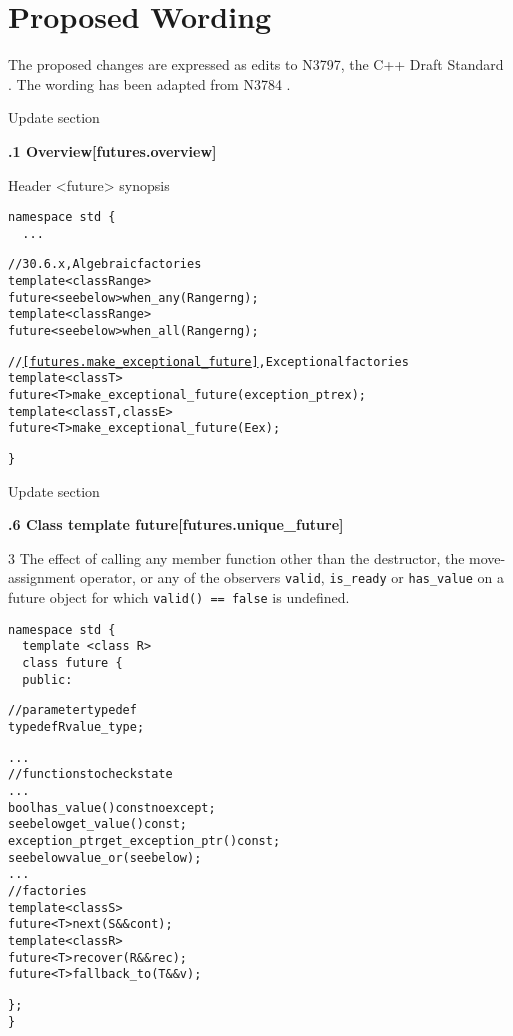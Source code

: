 \documentclass[a4paper,10pt]{article}
\newcommand{\wordingUpdateSubSubSec}[2]{\vspace{15pt}
\noindent
{\textbf{\quad #1\hfill\textbf{[#2]}}}
\label{#2}
\vspace{7pt}
}
\newcommand{\cpp}[1]{\lstinline{#1}}
\newcommand{\add}[1]{\textcolor{dkgreen}{#1}}
\begin{document}
\section{Proposed Wording}

The proposed changes are expressed as edits to N3797, the C++ Draft Standard \cite{CXX_DRAFT}. The wording has been adapted from N3784  \cite{N3784}.

\noindent
Update section

\wordingUpdateSubSubSec{30.6.1 Overview}{futures.overview}

\noindent
Header <future> synopsis

\begin{lstlisting}[xleftmargin=0pt]
namespace std {
  ...
\end{lstlisting}
\begin{alltt}
\add{
  // 30.6.x, Algebraic factories
  template <class Range>
  future<see below> when_any(Range rng);
  template <class Range>
  future<see below> when_all(Range rng);
  
  // \ref{futures.make_exceptional_future},  Exceptional factories
  template <class T>
  future<T> make_exceptional_future(exception_ptr ex);
  template <class T, class E>
  future<T> make_exceptional_future(E ex);
}  
\end{alltt}
\begin{lstlisting}[xleftmargin=0pt]
}
\end{lstlisting}

\noindent
Update section

\wordingUpdateSubSubSec{30.6.6 Class template future}{futures.unique_future}

3 The effect of calling any member function other than the destructor, the move-assignment operator, or \add{any of the observers} \cpp{valid}, \cpp{is_ready} or \add{\cpp{has_value}} on a future object for which \cpp{valid() == false} is undefined.

\begin{lstlisting}[xleftmargin=0pt]
namespace std {
  template <class R>
  class future {
  public:
\end{lstlisting}
\begin{alltt}
\add{
    // parameter typedef
    typedef R value_type;

  ...
    // functions to check state
    ...
    bool has_value() const noexcept;
    see below get_value() const;
    exception_ptr get_exception_ptr() const;
    see below value_or(see below);
  ...
    // factories
    template <class S>
      future<T> next(S&& cont);
    template <class R>
      future<T> recover(R&& rec);
    future<T> fallback_to(T&& v);
}
\end{alltt}
\begin{lstlisting}[xleftmargin=0pt]
  };
}
\end{lstlisting}
\end{document}
